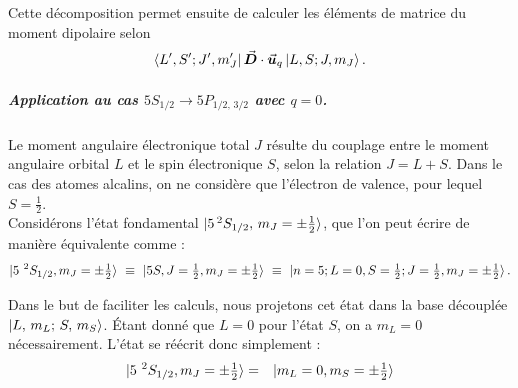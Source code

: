 Cette décomposition permet ensuite de calculer les éléments de matrice du moment dipolaire selon
\begin{eqnarray}
	\bra{L', S'; J', m_J'} \vec{{\bm{D}}} \cdot \vec{{\bm{u}}}_q \ket{L, S; J, m_J}.
\end{eqnarray}




\subparagraph{Application au cas $5S_{1/2} \rightarrow 5P_{1/2,\,3/2}$ avec $q = 0$.}


Le moment angulaire électronique total $J$ résulte du couplage entre le moment angulaire orbital $L$ et le spin électronique $S$, selon la relation $J = L + S$. Dans le cas des atomes alcalins, on ne considère que l’électron de valence, pour lequel $S = \tfrac12$.\\

Considérons l’état fondamental $\ket{5\,^2S_{1/2},\,m_J = \pm \tfrac12}$, que l’on peut écrire de manière équivalente comme :
\begin{eqnarray}
	\ket{ 5{~}^2S_{1/2} , m_J = \pm \tfrac12  } ~\equiv~ \ket{ 5S , J=\tfrac12  , m_J= \pm \tfrac12  }  ~\equiv~ \ket{n=5 ; L=0 , S=\tfrac12 ;  J=\tfrac12  , m_J = \pm \tfrac12 }.
\end{eqnarray}

Dans le but de faciliter les calculs, nous projetons cet état dans la base découplée $\ket{L,\,m_L;\,S,\,m_S}$. Étant donné que $L = 0$ pour l’état $S$, on a $m_L = 0$ nécessairement. L’état se réécrit donc simplement :
\begin{eqnarray}\label{chap7:dipolaire:eq:5S_decomposed}
	\ket{ 5{~}^2S_{1/2} , m_J = \pm \tfrac12  } & = & \ket{  m_L = 0  , m_S = \pm \tfrac12}  	
\end{eqnarray}


